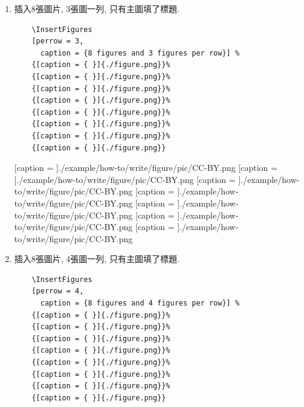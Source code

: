 \begin{enumerate}
{    %
    {[caption = { }]{./example/how-to/write/figure/pic/CC-BY-NC.png}}%
    {[caption = { }]{./example/how-to/write/figure/pic/CC-BY-ND.png}}%
    {[caption = { }]{./example/how-to/write/figure/pic/CC-BY-SA.png}}%
    {[caption = { }]{./example/how-to/write/figure/pic/CC-BY.png}}%
    {[caption = { }]{./example/how-to/write/figure/pic/CC-BY-NC.png}}%
    {[caption = { }]{./example/how-to/write/figure/pic/CC-BY-ND.png}}%
    {[caption = { }]{./example/how-to/write/figure/pic/CC-BY-SA.png}}
  } %

  \newpage
  \item
  {
    插入8張圖片, 3張圖一列, 只有主圖填了標題.\\
    \begin{verbatim}
    \InsertFigures
    [perrow = 3,
      caption = {8 figures and 3 figures per row}] %
    {[caption = { }]{./figure.png}}%
    {[caption = { }]{./figure.png}}%
    {[caption = { }]{./figure.png}}%
    {[caption = { }]{./figure.png}}%
    {[caption = { }]{./figure.png}}%
    {[caption = { }]{./figure.png}}%
    {[caption = { }]{./figure.png}}%
    {[caption = { }]{./figure.png}}
    \end{verbatim}

    {[caption = { }]{./example/how-to/write/figure/pic/CC-BY.png}}%
    {[caption = { }]{./example/how-to/write/figure/pic/CC-BY.png}}%
    {[caption = { }]{./example/how-to/write/figure/pic/CC-BY.png}}%
    {[caption = { }]{./example/how-to/write/figure/pic/CC-BY.png}}%
    {[caption = { }]{./example/how-to/write/figure/pic/CC-BY.png}}%
    {[caption = { }]{./example/how-to/write/figure/pic/CC-BY.png}}%
    {[caption = { }]{./example/how-to/write/figure/pic/CC-BY.png}}
  } %

  \newpage
  \item
  {
    插入8張圖片, 4張圖一列, 只有主圖填了標題.\\
    \begin{verbatim}
    \InsertFigures
    [perrow = 4,
      caption = {8 figures and 4 figures per row}] %
    {[caption = { }]{./figure.png}}%
    {[caption = { }]{./figure.png}}%
    {[caption = { }]{./figure.png}}%
    {[caption = { }]{./figure.png}}%
    {[caption = { }]{./figure.png}}%
    {[caption = { }]{./figure.png}}%
    {[caption = { }]{./figure.png}}%
    {[caption = { }]{./figure.png}}
    \end{verbatim}

}
\end{enumerate}
